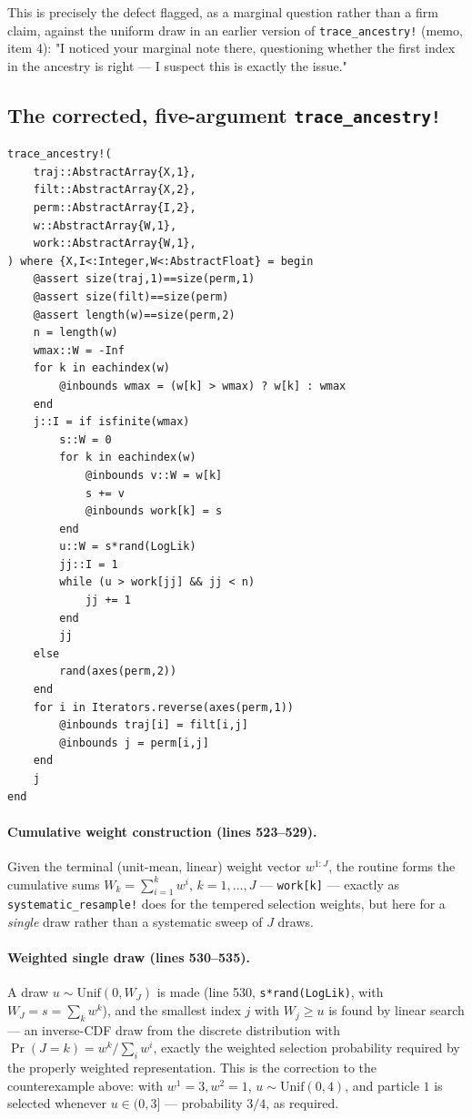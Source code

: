 \documentclass[11pt]{article}
\begin{document}
This is precisely the defect flagged, as a marginal question rather than a
firm claim, against the uniform draw in an earlier version of
\texttt{trace\_ancestry!} (memo, item 4): "I noticed your marginal note
there, questioning whether the first index in the ancestry is right — I
suspect this is exactly the issue."

\subsection{The corrected, five-argument \texttt{trace\_ancestry!}}

\begin{lstlisting}[caption={Weighted ancestral-lineage tracing (\texttt{pfilter.jl}, lines 508--544)}]
trace_ancestry!(
    traj::AbstractArray{X,1},
    filt::AbstractArray{X,2},
    perm::AbstractArray{I,2},
    w::AbstractArray{W,1},
    work::AbstractArray{W,1},
) where {X,I<:Integer,W<:AbstractFloat} = begin
    @assert size(traj,1)==size(perm,1)
    @assert size(filt)==size(perm)
    @assert length(w)==size(perm,2)
    n = length(w)
    wmax::W = -Inf
    for k in eachindex(w)
        @inbounds wmax = (w[k] > wmax) ? w[k] : wmax
    end
    j::I = if isfinite(wmax)
        s::W = 0
        for k in eachindex(w)
            @inbounds v::W = w[k]
            s += v
            @inbounds work[k] = s
        end
        u::W = s*rand(LogLik)
        jj::I = 1
        while (u > work[jj] && jj < n)
            jj += 1
        end
        jj
    else
        rand(axes(perm,2))
    end
    for i in Iterators.reverse(axes(perm,1))
        @inbounds traj[i] = filt[i,j]
        @inbounds j = perm[i,j]
    end
    j
end
\end{lstlisting}

\paragraph{Cumulative weight construction (lines 523--529).} Given the
terminal (unit-mean, linear) weight vector $w^{1:J}$, the routine forms the
cumulative sums $W_k = \sum_{i=1}^k w^i$, $k=1,\dots,J$ — \texttt{work[k]} —
exactly as \texttt{systematic\_resample!} does for the tempered selection
weights, but here for a \emph{single} draw rather than a systematic sweep of
$J$ draws.

\paragraph{Weighted single draw (lines 530--535).} A draw $u\sim
\mathrm{Unif}(0,W_J)$ is made (line 530, \texttt{s*rand(LogLik)}, with
$W_J=s=\sum_k w^k$), and the smallest index $j$ with $W_j \ge u$ is found by
linear search — an inverse-CDF draw from the discrete distribution with
$\Pr(J=k)=w^k/\sum_i w^i$, exactly the weighted selection probability
required by the properly weighted representation. This is the correction to
the counterexample above: with $w^1=3,w^2=1$, $u\sim\mathrm{Unif}(0,4)$, and
particle $1$ is selected whenever $u\in(0,3]$ — probability $3/4$, as
required.
\end{document}
